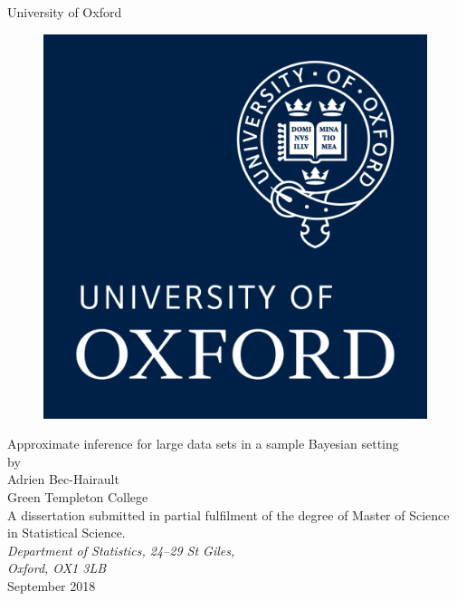 \documentclass[11pt,a4paper]{report}\usepackage[]{graphicx}\usepackage[]{color}
\begin{document}

\begin{titlepage}
\begin{center}
\vspace{1cm}
\textsf{\Huge{University of Oxford \\}}
\vspace{1cm}
\begin{figure}[htb]
\centering
\includegraphics[scale=.8]{logo.png}
\end{figure}
\vspace{2.0cm}
\Huge{Approximate inference for large data sets in a sample Bayesian setting\\}
\vspace{2.0cm}
\large{ by \\[14pt] Adrien Bec-Hairault \\[8pt] Green Templeton College} \\
\vspace{2.2cm}
\large{A dissertation submitted in partial fulfilment of the degree of Master of Science in Statistical Science.} \\
\vspace{.5cm}
\large{\emph{Department of Statistics, 24--29 St Giles, \\Oxford, OX1 3LB}} \\
\vspace{1.0cm}
\large{September 2018} \\
\end{center}
\end{titlepage}
\clearpage
\end{document}
